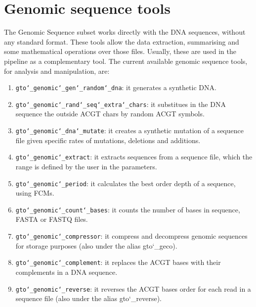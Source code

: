 \chapter{Genomic sequence tools}
\label{gst}
The Genomic Sequence subset works directly with the DNA sequences, without any standard format. These tools allow the data extraction, summarising and some mathematical operations over those files. Usually, these are used in the pipeline as a complementary tool. The current available genomic sequence tools, for analysis and manipulation, are:
\begin{enumerate}

\item \texttt{gto\char`_genomic\char`_gen\char`_random\char`_dna}: it generates a synthetic DNA.

\item \texttt{gto\char`_genomic\char`_rand\char`_seq\char`_extra\char`_chars}: it substitues in the DNA sequence the outside ACGT chars by random ACGT symbols.

\item \texttt{gto\char`_genomic\char`_dna\char`_mutate}: it creates a synthetic mutation of a sequence file given specific rates of mutations, deletions and additions.

\item \texttt{gto\char`_genomic\char`_extract}: it extracts sequences from a sequence file, which the range is defined by the user in the parameters.

\item \texttt{gto\char`_genomic\char`_period}: it calculates the best order depth of a sequence, using FCMs.

\item \texttt{gto\char`_genomic\char`_count\char`_bases}: it counts the number of bases in sequence, FASTA or FASTQ files.

\item \texttt{gto\char`_genomic\char`_compressor}: it compress and decompress genomic sequences for storage purposes (also under the alias gto\char`_geco).

\item \texttt{gto\char`_genomic\char`_complement}: it replaces the ACGT bases with their complements in a DNA sequence.

\item \texttt{gto\char`_genomic\char`_reverse}: it reverses the ACGT bases order for each read in a sequence file (also under the alias gto\char`_reverse).


\end{enumerate}
